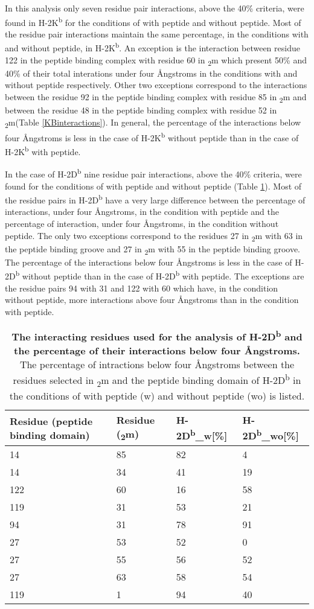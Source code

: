 \documentclass[11pt,twocolumn]{article}
\newcommand{\db}{H-2D\textsuperscript{b}\xspace}
\newcommand{\dbw}{H-2D\textsuperscript{b}\_w\xspace}
\newcommand{\dbwo}{H-2D\textsuperscript{b}\_wo\xspace}
\newcommand{\kb}{H-2K\textsuperscript{b}\xspace}
\newcommand{\angstr}{{\AA}ngstroms\xspace}
\newcommand{\btm}{\textbeta\textsubscript{2}m\xspace}
\begin{document}
In this analysis only seven residue pair interactions, above the 40\% criteria, were found in \kb for the conditions of with peptide  and without peptide. Most of the residue pair interactions maintain the same percentage, in  the conditions with and without peptide, in  \kb. An exception is the interaction between  residue 122 in the peptide binding complex with residue 60 in \btm which present 50\% and 40\% of their total interations under four \angstr in the conditions with and without peptide respectively. Other two exceptions correspond to the interactions between the residue 92  in the peptide binding complex with residue 85 in \btm and between the residue 48 in the peptide binding complex with residue 52 in \btm (Table \ref{KBinteractions}). In general, the percentage of the interactions below four \angstr is less in the case of \kb without peptide than in the case of \kb with peptide.  




In the case of \db nine residue pair interactions, above the 40\% criteria, were found for the conditions of with peptide and without peptide (Table \ref{DBinteractions}). Most of the residue pairs in \db have a very large difference between the percentage of interactions, under four \angstr,  in the condition with peptide and the percentage of interaction, under four \angstr, in the condition without peptide.    
The only two exceptions correspond to the residues 27 in \btm with 63 in the peptide binding groove and 27 in \btm with 55 in the peptide binding groove. The percentage of the interactions below four \angstr is less in the case of \db without peptide than in the case of \db with peptide. The exceptions are the residue pairs 94 with 31 and 122 with 60 which have, in the condition without peptide, more interactions above four \angstr than in the condition with peptide.  
 
 
 
\begin{table}[H]
\caption{\textbf{The interacting residues used for the analysis of \db and the percentage of their interactions below four \angstr. } The percentage of intractions below four \angstr between the residues selected in \btm and the peptide binding domain of \db in the conditions of with peptide (w) and without peptide (wo) is listed.}
\label{DBinteractions}
\begin{tabularx}{\linewidth}{|X|X|X|X|}  \hline
Residue (peptide binding domain)&Residue (\btm)&\dbw [\%]&\dbwo [\%]\\ \hline
14&85&82&4\\ \hline
14&34&41&19\\ \hline
122&60&16&58\\ \hline
119&31&53&21\\ \hline
94&31&78&91\\ \hline
27&53&52&0\\ \hline
27&55&56&52\\ \hline
27&63&58&54\\ \hline
119&1&94&40\\ \hline
\end{tabularx}
\end{table}
\end{document}
